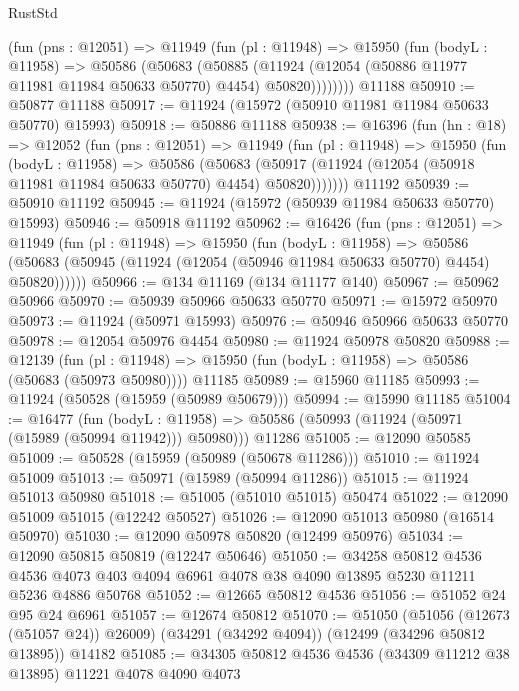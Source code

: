 \begin{lexlean}{RustStd}
\begin{coremodule}
{\begin{coremodule}
{{{{{{{{{{{{{{{{{{{{{{{{{{{{{{{{{{{{{{{{{{{{{{{{{{{{{{{{{{{{{{{{{{{{{{{{{{{{{{{{        (fun (pns : @12051) =>
        @11949
          (fun (pl : @11948) =>
          @15950
            (fun (bodyL : @11958) =>
            @50586
              (@50683
                (@50885
                  (@11924 (@12054 (@50886 @11977 @11981 @11984 @50633 @50770) @4454) @50820))))))))
    @11188
@50910 := @50877 @11188
@50917 := @11924 (@15972 (@50910 @11981 @11984 @50633 @50770) @15993)
@50918 := @50886 @11188
@50938 := @16396
    (fun (hn : @18) =>
    @12052
      (fun (pns : @12051) =>
      @11949
        (fun (pl : @11948) =>
        @15950
          (fun (bodyL : @11958) =>
          @50586
            (@50683
              (@50917 (@11924 (@12054 (@50918 @11981 @11984 @50633 @50770) @4454) @50820)))))))
    @11192
@50939 := @50910 @11192
@50945 := @11924 (@15972 (@50939 @11984 @50633 @50770) @15993)
@50946 := @50918 @11192
@50962 := @16426
    (fun (pns : @12051) =>
    @11949
      (fun (pl : @11948) =>
      @15950
        (fun (bodyL : @11958) =>
        @50586 (@50683 (@50945 (@11924 (@12054 (@50946 @11984 @50633 @50770) @4454) @50820))))))
@50966 := @134 @11169 (@134 @11177 @140)
@50967 := @50962 @50966
@50970 := @50939 @50966 @50633 @50770
@50971 := @15972 @50970
@50973 := @11924 (@50971 @15993)
@50976 := @50946 @50966 @50633 @50770
@50978 := @12054 @50976 @4454
@50980 := @11924 @50978 @50820
@50988 := @12139
    (fun (pl : @11948) => @15950 (fun (bodyL : @11958) => @50586 (@50683 (@50973 @50980))))
    @11185
@50989 := @15960 @11185
@50993 := @11924 (@50528 (@15959 (@50989 @50679)))
@50994 := @15990 @11185
@51004 := @16477
    (fun (bodyL : @11958) => @50586 (@50993 (@11924 (@50971 (@15989 (@50994 @11942))) @50980)))
    @11286
@51005 := @12090 @50585
@51009 := @50528 (@15959 (@50989 (@50678 @11286)))
@51010 := @11924 @51009
@51013 := @50971 (@15989 (@50994 @11286))
@51015 := @11924 @51013 @50980
@51018 := @51005 (@51010 @51015) @50474
@51022 := @12090 @51009 @51015 (@12242 @50527)
@51026 := @12090 @51013 @50980 (@16514 @50970)
@51030 := @12090 @50978 @50820 (@12499 @50976)
@51034 := @12090 @50815 @50819 (@12247 @50646)
@51050 := @34258
    @50812
    @4536
    @4536
    @4073
    @403
    @4094
    @6961
    @4078
    @38
    @4090
    @13895
    @5230
    @11211
    @5236
    @4886
    @50768
@51052 := @12665 @50812 @4536
@51056 := @51052 @24 @95 @24 @6961
@51057 := @12674 @50812
@51070 := @51050
    (@51056 (@12673 (@51057 @24)) @26009)
    (@34291 (@34292 @4094))
    (@12499 (@34296 @50812 @13895))
    @14182
@51085 := @34305
    @50812
    @4536
    @4536
    (@34309 @11212 @38 @13895)
    @11221
    @4078
    @4090
    @4073
}}}}}}}}}}}}}}}}}}}}}}}}}}}}}}}}}}}}}}}}}}}}}}}}}}}}}}}}}}}}}}}}}}}}}}}}}}}}}}}}
\end{coremodule}}
\end{coremodule}
\end{lexlean}
